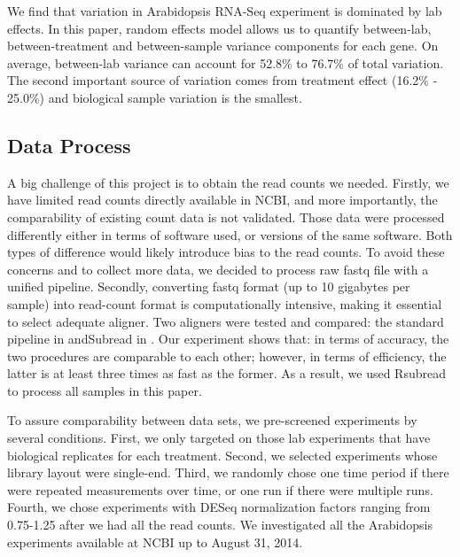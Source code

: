 \documentclass[11pt, a4paper]{article}
\begin{document}
   We find that variation in Arabidopsis RNA-Seq experiment is dominated by lab effects. In this paper, random effects model allows us to quantify  between-lab, between-treatment and between-sample variance components for each gene.
On average, between-lab variance can account for 52.8\% to 76.7\% of total variation. The second important source of variation comes from treatment effect (16.2\% - 25.0\%) and biological sample variation is the smallest. 
  \subsection{Data Process}
  A big challenge of this project is to obtain the read counts we needed. Firstly, we have limited read counts directly available in NCBI, and more importantly,  the comparability of existing count data is not validated. Those data were processed differently either in terms of software used, or versions of the same software. Both types of difference would likely introduce bias to the read counts. To avoid these concerns and to collect more data, we decided to process raw fastq file with a unified pipeline. Secondly, converting fastq format (up to 10 gigabytes per sample)  into read-count format is computationally intensive, making it essential to select adequate aligner. Two aligners were tested and compared: the standard pipeline in \cite{anders2013count} andSubread in \cite{liao2013subread}.  Our experiment shows that:  in terms of accuracy, the two procedures are comparable to each other; however, in terms of efficiency, the latter is at least three times as fast as the former. As a result, we used Rsubread to process all samples in this paper.

To assure comparability between data sets, we pre-screened experiments by several conditions. First, we only targeted on those lab experiments that have biological replicates for each treatment. Second, we selected experiments whose library layout were single-end. Third, we randomly chose one time period if there were repeated measurements over time, or one run if there were multiple runs. Fourth, we chose experiments with DESeq normalization factors ranging from 0.75-1.25 after we had all the read counts. We investigated all the Arabidopsis experiments available at NCBI up to August 31, 2014.
\end{document}
